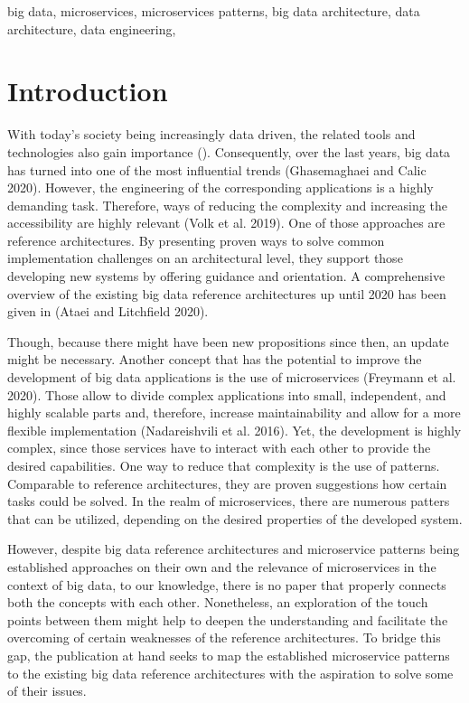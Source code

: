 \documentclass[conference]{IEEEtran}
\begin{document}
\begin{IEEEkeywords}
big data, microservices, microservices patterns, big data architecture, data architecture, data engineering, 
\end{IEEEkeywords}

\section{Introduction}

With today’s society being increasingly data driven, the related tools and technologies also gain importance (\cite{Levin.2021}). Consequently, over the last years, big data has turned into one of the most influential trends (Ghasemaghaei and Calic 2020). However, the engineering of the corresponding applications is a highly demanding task. Therefore, ways of reducing the complexity and increasing the accessibility are highly relevant (Volk et al. 2019). One of those approaches are reference architectures. By presenting proven ways to solve common implementation challenges on an architectural level, they support those developing new systems by offering guidance and orientation. A comprehensive overview of the existing big data reference architectures up until 2020 has been given in (Ataei and Litchfield 2020). 

Though, because there might have been new propositions since then, an update might be necessary.
Another concept that has the potential to improve the development of big data applications is the use of microservices (Freymann et al. 2020). Those allow to divide complex applications into small, independent, and highly scalable parts and, therefore, increase maintainability and allow for a more flexible implementation (Nadareishvili et al. 2016). Yet, the development is highly complex, since those services have to interact with each other to provide the desired capabilities. One way to reduce that complexity is the use of patterns. Comparable to reference architectures, they are proven suggestions how certain tasks could be solved. In the realm of microservices, there are numerous patters that can be utilized, depending on the desired properties of the developed system.

However, despite big data reference architectures and microservice patterns being established approaches on their own and the relevance of microservices in the context of big data, to our knowledge, there is no paper that properly connects both the concepts with each other. Nonetheless, an exploration of the touch points between them might help to deepen the understanding and facilitate the overcoming of certain weaknesses of the reference architectures. To bridge this gap, the publication at hand seeks to map the established microservice patterns to the existing big data reference architectures with the aspiration to solve some of their issues.
\end{document}
